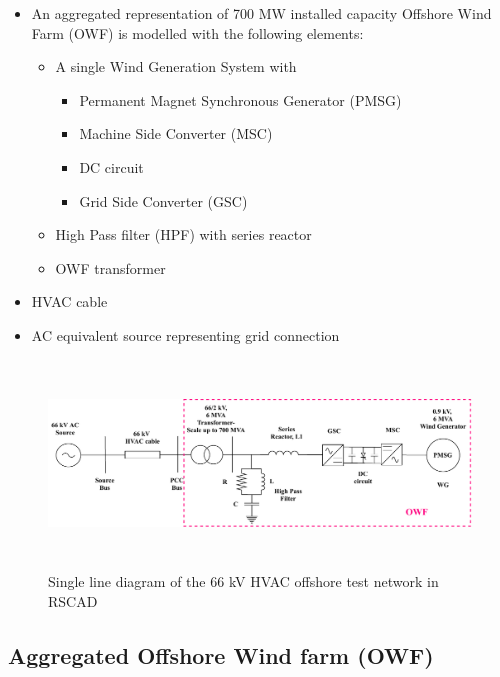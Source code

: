 \begin{itemize}
    \item An aggregated representation of 700 MW installed capacity Offshore Wind Farm (\gls{OWF}) is modelled with the following elements:
    \begin{itemize}
        \item A single Wind Generation System with 
    \begin{itemize}
        \item Permanent Magnet Synchronous Generator (\gls{PMSG})
        \item Machine Side Converter (\gls{MSC})
        \item \gls{DC} circuit
        \item Grid Side Converter (\gls{GSC}) 
    \end{itemize}
        \item High Pass filter (\gls{HPF}) with series reactor
        \item \gls{OWF} transformer
    \end{itemize}
    \item \gls{HVAC} cable  
     \item AC equivalent source representing grid connection
\end{itemize}

\begin{figure}[H]
\centering
    \includegraphics[height = 5.5cm,width = 17cm]{Diagrams/Chapter_3/WT1_AC_RSCAD_OWF.pdf}
    \caption{Single line diagram of the 66 kV HVAC offshore test network in RSCAD}
    \label{fig:WT1_Model_RSCAD}
\end{figure}

\subsection{ Aggregated Offshore Wind farm (OWF)}\label{OWF}

